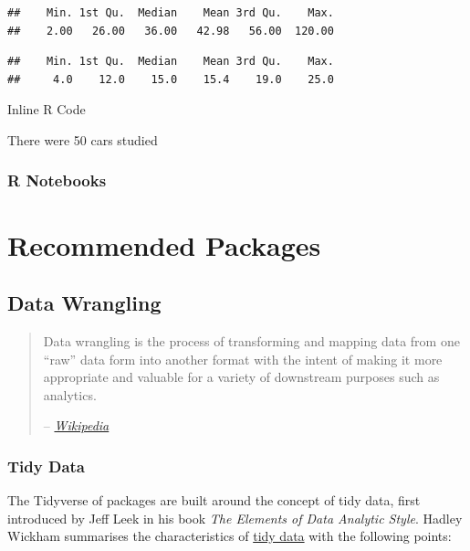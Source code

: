 \documentclass[]{book}
\newenvironment{Shaded}{\begin{snugshade}}{\end{snugshade}}
\newcommand{\KeywordTok}[1]{\textcolor[rgb]{0.13,0.29,0.53}{\textbf{#1}}}
\newcommand{\OperatorTok}[1]{\textcolor[rgb]{0.81,0.36,0.00}{\textbf{#1}}}
\newcommand{\NormalTok}[1]{#1}
\theoremstyle{definition}
\theoremstyle{definition}
\theoremstyle{definition}
\theoremstyle{remark}
\begin{document}
\begin{verbatim}
##    Min. 1st Qu.  Median    Mean 3rd Qu.    Max. 
##    2.00   26.00   36.00   42.98   56.00  120.00
\end{verbatim}

\begin{Shaded}
\end{Shaded}

\begin{verbatim}
##    Min. 1st Qu.  Median    Mean 3rd Qu.    Max. 
##     4.0    12.0    15.0    15.4    19.0    25.0
\end{verbatim}

Inline R Code

There were 50 cars studied

\subsection{R Notebooks}\label{r-notebooks}

\chapter{Recommended Packages}\label{packages}

\section{Data Wrangling}\label{data-wrangling}

\begin{quote}
Data wrangling is the process of transforming and mapping data from one
``raw'' data form into another format with the intent of making it more
appropriate and valuable for a variety of downstream purposes such as
analytics.

-- \href{https://en.wikipedia.org/wiki/Data_wrangling}{\emph{Wikipedia}}
\end{quote}

\subsection{Tidy Data}\label{tidy-data}

The Tidyverse of packages are built around the concept of tidy data,
first introduced by Jeff Leek in his book \emph{The Elements of Data
Analytic Style}. Hadley Wickham summarises the characteristics of
\href{http://tidyr.tidyverse.org/articles/tidy-data.html}{tidy data}
with the following points:
\end{document}
